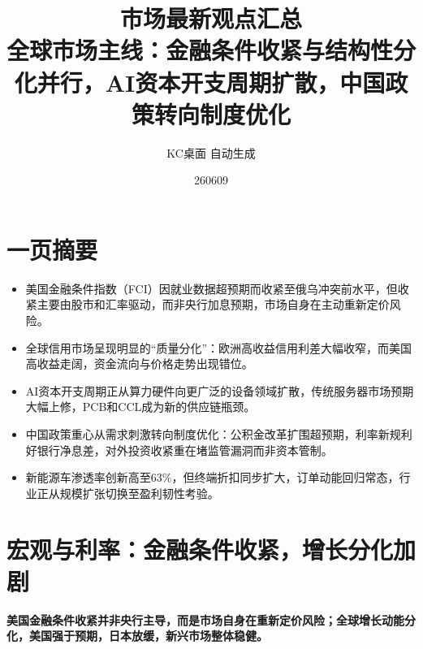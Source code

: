 \documentclass[11pt]{ctexart}
\title{\textbf{市场最新观点汇总}\\[0.4em]{\large 全球市场主线：金融条件收紧与结构性分化并行，AI资本开支周期扩散，中国政策转向制度优化}}
\author{KC桌面 自动生成}
\date{260609}
\begin{document}
\maketitle
\tableofcontents
\newpage
\section{一页摘要}
\begin{itemize}
  \item 美国金融条件指数（FCI）因就业数据超预期而收紧至俄乌冲突前水平，但收紧主要由股市和汇率驱动，而非央行加息预期，市场自身在主动重新定价风险。
  \item 全球信用市场呈现明显的“质量分化”：欧洲高收益信用利差大幅收窄，而美国高收益走阔，资金流向与价格走势出现错位。
  \item AI资本开支周期正从算力硬件向更广泛的设备领域扩散，传统服务器市场预期大幅上修，PCB和CCL成为新的供应链瓶颈。
  \item 中国政策重心从需求刺激转向制度优化：公积金改革扩围超预期，利率新规利好银行净息差，对外投资收紧重在堵监管漏洞而非资本管制。
  \item 新能源车渗透率创新高至63\%，但终端折扣同步扩大，订单动能回归常态，行业正从规模扩张切换至盈利韧性考验。
\end{itemize}
\section{宏观与利率：金融条件收紧，增长分化加剧}
\textbf{美国金融条件收紧并非央行主导，而是市场自身在重新定价风险；全球增长动能分化，美国强于预期，日本放缓，新兴市场整体稳健。}
\end{document}

